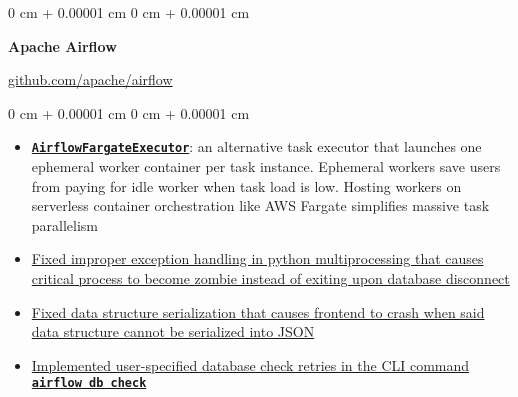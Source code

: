 \documentclass[10pt, letterpaper]{article}
\newenvironment{highlights}{
    \begin{itemize}[
        topsep=0.10 cm,
        parsep=0.10 cm,
        partopsep=0pt,
        itemsep=0pt,
        leftmargin=0 cm + 10pt
    ]
}{
    \end{itemize}
} %
\newenvironment{onecolentry}{
    \begin{adjustwidth}{
        0 cm + 0.00001 cm
    }{
        0 cm + 0.00001 cm
    }
}{
    \end{adjustwidth}
} %
\newenvironment{twocolentry}[2][]{
    \onecolentry
    \def\secondColumn{#2}
    \setcolumnwidth{\fill, 4.5 cm}
    \begin{paracol}{2}
}{
    \switchcolumn \raggedleft \secondColumn
    \end{paracol}
    \endonecolentry
} %
\begin{document}
        \begin{twocolentry}
            {\href{https://github.com/apache/airflow}{github.com/apache/airflow}}
            {\textbf{Apache Airflow}}
        \end{twocolentry}
        \vspace{0.1cm}
        \begin{onecolentry}
            \begin{highlights}
                \item \href{https://github.com/aelzeiny/airflow-aws-executors/tree/master}{\textbf{\texttt{AirflowFargateExecutor}}}: an alternative task executor that launches one ephemeral worker container per task instance. Ephemeral workers save users from paying for idle worker when task load is low. Hosting workers on serverless container orchestration like AWS Fargate simplifies massive task parallelism
                \item \href{https://github.com/apache/airflow/issues/32706}{Fixed improper exception handling in python multiprocessing that causes critical process to become zombie instead of exiting upon database disconnect}
                \item \href{https://github.com/apache/airflow/pull/32385}{Fixed data structure serialization that causes frontend to crash when said data structure cannot be serialized into JSON}
                \item \href{https://github.com/apache/airflow/pull/31836}{Implemented user-specified database check retries in the CLI command \texttt{\textbf{airflow db check}}}
            \end{highlights}
        \end{onecolentry}
\end{document}
